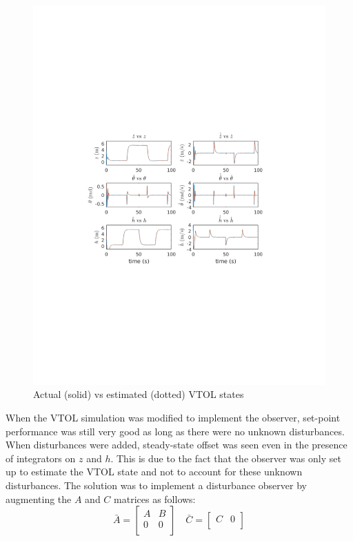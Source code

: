 \documentclass[dvips,12pt]{article}
\begin{document}
\begin{figure}[h] %
   \centering
   \includegraphics[trim = {4cm 8.5cm 4cm 9cm},clip,width=5.5in]{observerstates.pdf}
   \caption{Actual (solid) vs estimated (dotted) VTOL states}
   \label{fig:stateestimate}
\end{figure}

When the VTOL simulation was modified to implement the observer, set-point performance was still very good as long as there were no unknown disturbances.  When disturbances were added, steady-state offset was seen even in the presence of integrators on $z$ and $h$.  This is due to the fact that the observer was only set up to estimate the VTOL state and not to account for these unknown disturbances.  The solution was to implement a disturbance observer by augmenting the $A$ and $C$ matrices as follows:
\begin{equation}
 \bar{A}
 = 
   \begin{bmatrix}
        A & B  \\
        0 & 0  \\

      \end{bmatrix}
      \quad
      \bar{C}
       = 
         \begin{bmatrix}
              C & 0  \\
            \end{bmatrix}         
\end{equation}
\end{document}
